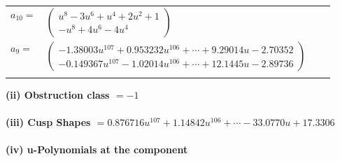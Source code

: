 \documentclass[1p]{elsarticle_modified}
\theoremstyle{definition}
\begin{document}
\begin{tabular}{m{7pt} m{180pt} m{7pt} m{180pt} }
\flushright $a_{10}=$&$\begin{pmatrix}u^8-3 u^6+u^4+2 u^2+1\\- u^8+4 u^6-4 u^4\end{pmatrix}$ \\
\flushright $a_{9}=$&$\begin{pmatrix}-1.38003 u^{107}+0.953232 u^{106}+\cdots+9.29014 u-2.70352\\-0.149367 u^{107}-1.02014 u^{106}+\cdots+12.1445 u-2.89736\end{pmatrix}$\\&\end{tabular}
\flushleft \textbf{(ii) Obstruction class $= -1$}\\~\\
\flushleft \textbf{(iii) Cusp Shapes $= 0.876716 u^{107}+1.14842 u^{106}+\cdots-33.0770 u+17.3306$}\\~\\
\newpage\renewcommand{\arraystretch}{1}
\flushleft \textbf{(iv) u-Polynomials at the component}\newline \\
\end{document}
